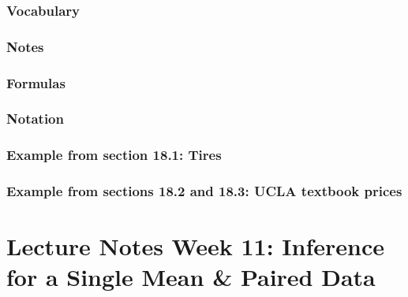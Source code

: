 \documentclass[
]{report}
\begin{document}
\hypertarget{vocabulary-18}{%
\subsubsection*{Vocabulary}\label{vocabulary-18}}

\hypertarget{notes-23}{%
\subsubsection*{Notes}\label{notes-23}}

\hypertarget{formulas-4}{%
\subsubsection*{Formulas}\label{formulas-4}}

\hypertarget{notation-3}{%
\subsubsection*{Notation}\label{notation-3}}

\hypertarget{example-from-section-18.1-tires}{%
\subsubsection*{Example from section 18.1: Tires}\label{example-from-section-18.1-tires}}

\hypertarget{example-from-sections-18.2-and-18.3-ucla-textbook-prices}{%
\subsubsection*{Example from sections 18.2 and 18.3: UCLA textbook prices}\label{example-from-sections-18.2-and-18.3-ucla-textbook-prices}}

\hypertarget{lecture-notes-week-11-inference-for-a-single-mean-paired-data}{%
\section{Lecture Notes Week 11: Inference for a Single Mean \& Paired Data}\label{lecture-notes-week-11-inference-for-a-single-mean-paired-data}}
\end{document}
